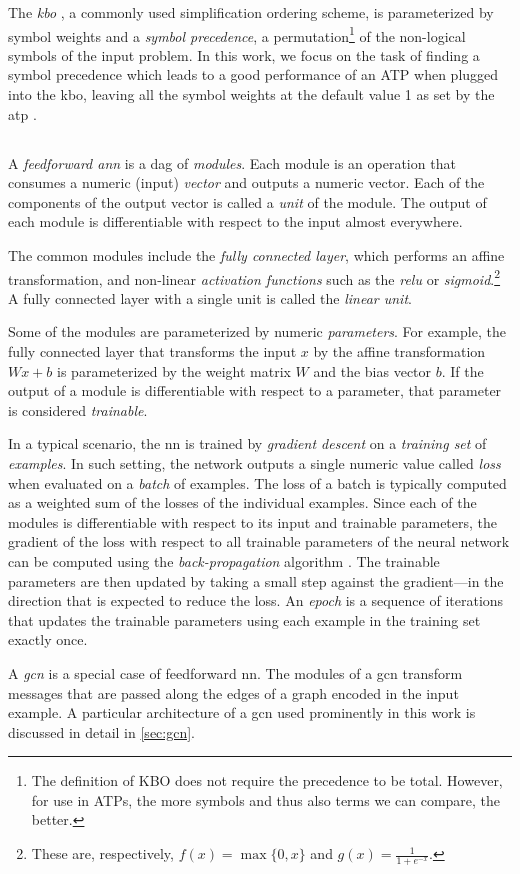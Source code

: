 The \emph{\acrfull{kbo}} \cite{Knuth1983}, a commonly used simplification ordering scheme,
is parameterized by symbol weights and a \emph{symbol precedence},
a permutation\footnote{
The definition of KBO does not require the precedence to be total. 
However, for use in ATPs, the more symbols and thus also terms 
we can compare, the better. %
} of the non-logical symbols of the input problem.
In this work, we focus on the task of finding a symbol precedence which
leads to a good performance of an ATP
when plugged into the \gls{kbo},
leaving all the symbol weights at the default 
value 1 as set by the \gls{atp} \Vampire{}.

\subsection{}

A \emph{feedforward \acrlong{ann}} \cite{DBLP:books/daglib/0040158} is a \acrlong{dag} of \emph{modules}.
Each module is an operation that consumes a numeric (input) \emph{vector} and outputs a numeric vector.
Each of the components of the output vector is called a \emph{unit} of the module.
The output of each module is differentiable with respect to the input almost everywhere.

The common modules include
the \emph{fully connected layer}, which performs an affine transformation,
and non-linear \emph{activation functions} such as the \emph{\gls{relu}} or \emph{sigmoid}.\footnote{
These are, respectively, $f(x) = \max\{0,x\}$ and $g(x) = \frac{1}{1+e^{-x}}$.}
A fully connected layer with a single unit is called the \emph{linear unit}.

Some of the modules are parameterized by numeric \emph{parameters}.
For example, the fully connected layer that transforms the input $x$ by the affine transformation $Wx + b$
is parameterized by the weight matrix $W$ and the bias vector $b$.
If the output of a module is differentiable with respect to a parameter,
that parameter is considered \emph{trainable}.

In a typical scenario, the \acrlong{nn} is trained by \emph{gradient descent} on a \emph{training set} of \emph{examples}.
In such setting, the network outputs a single numeric value called \emph{loss} when evaluated on a \emph{batch} of examples.
The loss of a batch is typically computed as a weighted sum of the losses of the individual examples.
Since each of the modules is differentiable with respect to its input and trainable parameters,
the gradient of the loss with respect to all trainable parameters of the neural network
can be computed using the \emph{back-propagation} algorithm \cite{DBLP:books/daglib/0040158}.
The trainable parameters are then updated by taking a small step
against the gradient---in the direction that is expected to reduce the loss.
An \emph{epoch} is a sequence of iterations that updates the trainable parameters
using each example in the training set exactly once.

A \emph{\gls{gcn}} is a special case of feedforward \acrlong{nn}.
The modules of a \gls{gcn} transform messages that are passed along the edges of a graph encoded in the input example.
A particular architecture of a \gls{gcn} used prominently in this work is discussed in detail in \cref{sec:gcn}.
